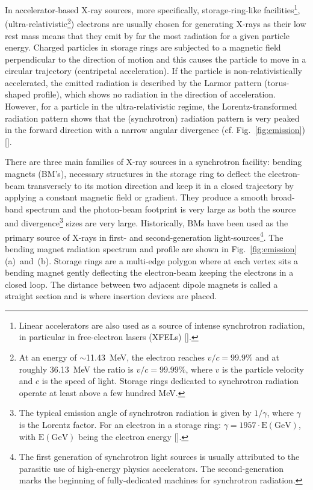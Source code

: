 \begin{refsection}
In accelerator-based X-ray sources, more specifically, storage-ring-like facilities\footnote{Linear accelerators are also used as a source of intense synchrotron radiation, in particular in free-electron lasers (XFELs) [\cite{Huang2007}].}, (ultra-relativistic\footnote{At an energy of $\sim$11.43~MeV, the electron reaches $v/c = 99.9\%$ and at roughly 36.13~MeV the ratio is $v/c = 99.99\%$, where $v$ is the particle velocity and $c$ is the speed of light. Storage rings dedicated to synchrotron radiation operate at least above a few hundred MeV.}) electrons are usually chosen for generating X-rays as their low rest mass means that they emit by far the most radiation for a given particle energy. Charged particles in storage rings are subjected to a magnetic field perpendicular to the direction of motion and this causes the particle to move in a circular trajectory (centripetal acceleration). If the particle is non-relativistically accelerated, the emitted radiation is described by the Larmor pattern (torus-shaped profile), which shows no radiation in the direction of acceleration. However, for a particle in the ultra-relativistic regime, the Lorentz-transformed radiation pattern shows that the (synchrotron) radiation pattern is very peaked in the forward direction with a narrow angular divergence (cf. Fig.~\ref{fig:emission}) [\cite{Jackson1998}].

There are three main families of X-ray sources in a synchrotron facility: bending magnets (BM's), necessary structures in the storage ring to deflect the electron-beam transversely to its motion direction and keep it in a closed trajectory by applying a constant magnetic field or gradient. They produce a smooth broad-band spectrum and the photon-beam footprint is very large as both the source and divergence\footnote{The typical emission angle of synchrotron radiation is given by $1/\gamma$, where $\gamma$ is the Lorentz factor. For an electron in a storage ring: $\gamma=1957\cdot\mathrm{E(GeV)}$, with $\mathrm{E(GeV)}$ being the electron energy [\cite[\textit{§2.2.1}]{Als-Nielsen2011}].} sizes are very large. Historically, BMs have been used as the primary source of X-rays in first- and second-generation light-sources\footnote{The first generation of synchrotron light sources is usually attributed to the parasitic use of high-energy physics accelerators. The second-generation marks the beginning of fully-dedicated machines for synchrotron radiation.}. The bending magnet radiation spectrum and profile are shown in Fig.~\ref{fig:emission}(a)~and~(b). Storage rings are a multi-edge polygon where at each vertex sits a bending magnet gently deflecting the electron-beam keeping the electrons in a closed loop. The distance between two adjacent dipole magnets is called a straight section and is where insertion devices are placed.


\end{refsection}
